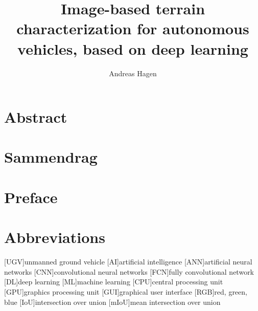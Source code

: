 \documentclass[USenglish]{ifimaster}  %
\title{Image-based terrain characterization for autonomous vehicles, based on deep learning}        %
\author{Andreas Hagen}                      %
\begin{document}
\duoforside[dept={Department of Technology Systems},   %
  program={Cybernetics},  %
  short]                                        %

\frontmatter{}
\chapter*{Abstract}                   %
\chapter*{Sammendrag}
\chapter*{Preface}

\tableofcontents{}
\listoffigures{}
\listoftables{}

\chapter*{Abbreviations}
\begin{acronym}
        [UGV]{unmanned ground vehicle}
        [AI]{artificial intelligence}
        [ANN]{artificial neural networks}
        [CNN]{convolutional neural networks}
        [FCN]{fully convolutional network}
        [DL]{deep learning}
        [ML]{machine learning}
        [CPU]{central processing unit}
        [GPU]{graphics processing unit}
        [GUI]{graphical user interface}
        [RGB]{red, green, blue}
        [IoU]{intersection over union}
        [mIoU]{mean intersection over union}
\end{acronym}
\end{document}
